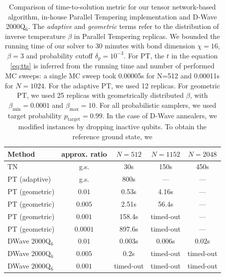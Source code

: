 \begin{table}[b]
  \centering
  \begin{tabular}{|l|c|ccc|}
    \hline
    \rowcolor{theader}  Method & approx. ratio & $N=512$   & $N=1152$  & $N=2048$  \\
    \hline
    TN                         & g.s.          & 30s       & 150s      & 450s      \\
    \hline
    \hline
    PT (adaptive)              & g.s.          & 800s      & ---       & ---       \\
    \hline
    PT (geometric)             & $0.01$        & 0.53s     & 4.16s     & ---       \\
    PT (geometric)             & $0.005$       & 2.51s     & 56.4s     & ---       \\
    PT (geometric)             & $0.001$       & 158.4s    & timed-out & ---       \\
    PT (geometric)             & $0.0001$      & 897.6s    & timed-out & ---       \\
    \hline
    \hline
    DWave 2000Q$_6$            & $0.01$        & $0.003$s  & $0.006$s  & $0.02$s   \\
    DWave 2000Q$_6$            & $0.005$       & $0.2$s    & timed-out & timed-out \\
    DWave 2000Q$_6$            & $0.001$       & timed-out & timed-out & timed-out \\
    \hline
    \hline
  \end{tabular}
  \caption{Comparison of time-to-solution metric for our tensor network-based algorithm,
    in-house Parallel Tempering implementation and D-Wave 2000Q$_{6}$. The
    \emph{adaptive} and \emph{geometric} terms refer to the distribution of inverse
    temperature $\beta$ in Parallel Tempering replicas. We bounded the running time
    of our solver to 30 minutes with bond dimension $\chi = 16$, $\beta=3$ and
    probability cutoff $\delta_{p} = 10^{-3}$. For PT, the $t$ in the equation
    \ref{eq:tts} is inferred from the running time and number of performed MC
    sweeps: a single MC sweep took 0.00005s for N=512 and 0.00011s for $N=1024$.
    For the adaptive PT, we used 12 replicas. For geometric PT, we used 25 replicas
    with geometrically distributed $\beta$, with $\beta_{\min}=0.0001$ and
      $\beta_{\max}=10$. For all probabilistic samplers, we used target probability
      $p_{\mbox{target}}=0.99$. In the case of D-Wave annealers, we modified
        instances by dropping inactive qubits. To obtain the reference ground state, we
}
\end{table}

